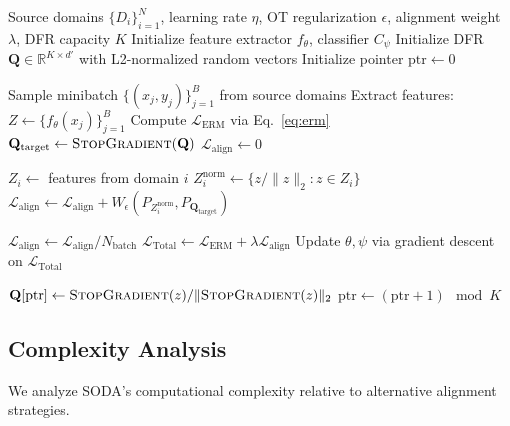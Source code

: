 \begin{algorithm}[H]
\caption{SODA: Stabilized Optimal Transport Based Domain Alignment}
\label{alg:sota}
\begin{algorithmic}[1]
    \Require Source domains $\{D_i\}_{i=1}^N$, learning rate $\eta$, OT regularization $\epsilon$, alignment weight $\lambda$, DFR capacity $K$
    \State Initialize feature extractor $f_\theta$, classifier $C_\psi$
    \State Initialize DFR $\mathbf{Q} \in \mathbb{R}^{K \times d'}$ with L2-normalized random vectors
    \State Initialize pointer $\text{ptr} \leftarrow 0$
    
        \State Sample minibatch $\{(x_j, y_j)\}_{j=1}^B$ from source domains
        \State Extract features: $Z \leftarrow \{f_\theta(x_j)\}_{j=1}^B$
        \State Compute $\mathcal{L}_{\text{ERM}}$ via Eq.~\ref{eq:erm}
        \State $\mathbf{Q}_{\text{target}} \leftarrow \textsc{StopGradient}(\mathbf{Q})$ 
        \State $\mathcal{L}_{\text{align}} \leftarrow 0$
        
            \State $Z_i \leftarrow$ features from domain $i$
            \State $Z_i^{\text{norm}} \leftarrow \{z / \|z\|_2 : z \in Z_i\}$
            \State $\mathcal{L}_{\text{align}} \leftarrow \mathcal{L}_{\text{align}} + W_{\epsilon}(P_{Z_i^{\text{norm}}}, P_{\mathbf{Q}_{\text{target}}})$
        \EndFor
        
        \State $\mathcal{L}_{\text{align}} \leftarrow \mathcal{L}_{\text{align}} / N_{\text{batch}}$
        \State $\mathcal{L}_{\text{Total}} \leftarrow \mathcal{L}_{\text{ERM}} + \lambda \mathcal{L}_{\text{align}}$
        \State Update $\theta, \psi$ via gradient descent on $\mathcal{L}_{\text{Total}}$
        
         
            \State $\mathbf{Q}[\text{ptr}] \leftarrow \textsc{StopGradient}(z) / \|\textsc{StopGradient}(z)\|_2$
            \State $\text{ptr} \leftarrow (\text{ptr} + 1) \mod K$
        \EndFor
    \EndWhile
\end{algorithmic}
\end{algorithm}


\subsection{Complexity Analysis}
\label{sec:complexity}

We analyze SODA's computational complexity relative to alternative alignment strategies.

